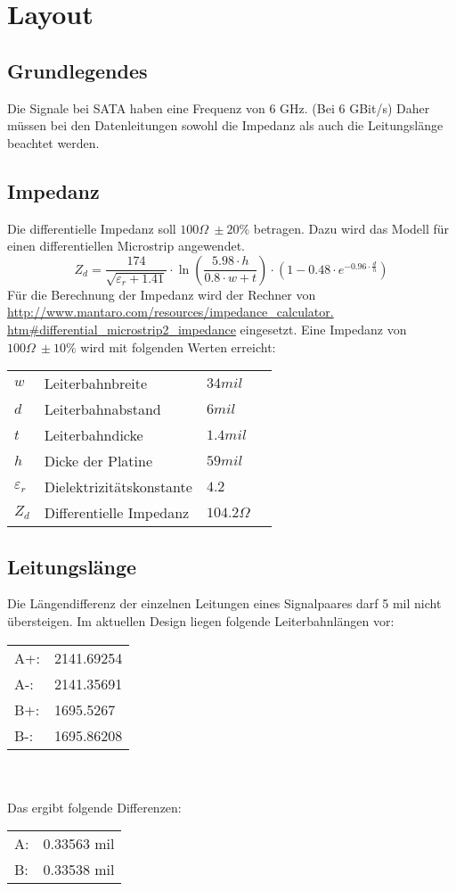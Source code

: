 
\section{Layout}

\subsection{Grundlegendes}
Die Signale bei SATA haben eine Frequenz von 6 GHz. (Bei 6 GBit/s)
Daher müssen bei den Datenleitungen sowohl die Impedanz als auch die 
Leitungslänge beachtet werden. 

\subsection{Impedanz}
Die differentielle Impedanz soll $100 \Omega~\pm 20 \%$ betragen. Dazu wird das 
Modell für einen differentiellen Microstrip angewendet. 
\[ Z_d = \frac{174}{\sqrt{\varepsilon_r + 1.41}} \cdot 
\ln \left(\frac{5.98 \cdot h}{0.8 \cdot w + t}\right) \cdot 
\left(1 - 0.48 \cdot e^{-0.96 \cdot \frac{d}{h}}\right) \]
Für die Berechnung der Impedanz wird der Rechner von 
\url{http://www.mantaro.com/resources/impedance_calculator.
htm#differential_microstrip2_impedance} 
eingesetzt. 
Eine Impedanz von $100 \Omega~\pm 10 \%$ wird mit folgenden Werten erreicht: 
\begin{tabular}{@{}llll}
$w$             & Leiterbahnbreite          &   $34 mil$        \\
$d$             & Leiterbahnabstand         &   $6 mil$         \\
$t$             & Leiterbahndicke           &   $1.4 mil$       \\
$h$             & Dicke der Platine         &   $59 mil$        \\
$\varepsilon_r$ & Dielektrizitätskonstante  &   $4.2$           \\
$Z_d$           & Differentielle Impedanz   &   $104.2 \Omega$  
\end{tabular}

\subsection{Leitungslänge}
Die Längendifferenz der einzelnen Leitungen eines Signalpaares darf 5 mil 
nicht übersteigen. Im aktuellen Design liegen folgende Leiterbahnlängen vor: \\
\begin{tabular}{@{}ll}
A+: & 2141.69254 \\
A-: & 2141.35691 \\
B+: & 1695.5267 \\
B-: & 1695.86208 \\
\end{tabular} \\\\
Das ergibt folgende Differenzen: \\
\begin{tabular}{@{}ll}
A:  & 0.33563 mil \\
B:  & 0.33538 mil \\
\end{tabular}
